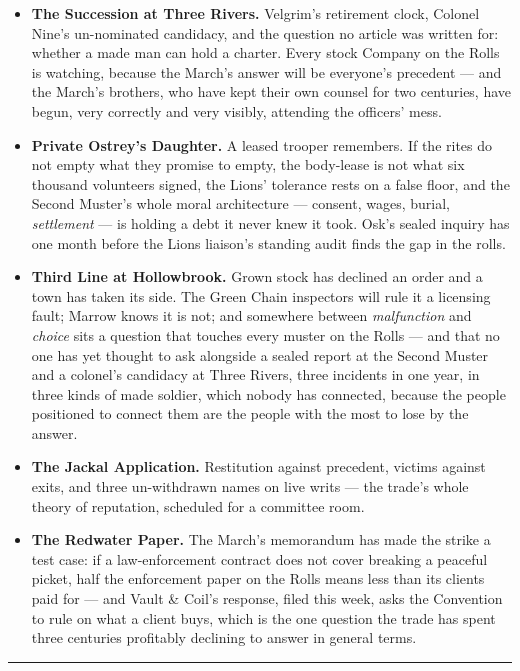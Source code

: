 \begin{itemize}
    \item \textbf{The Succession at Three Rivers.} Velgrim's retirement clock, Colonel Nine's un-nominated candidacy, and the question no article was written for: whether a made man can hold a charter. Every stock Company on the Rolls is watching, because the March's answer will be everyone's precedent --- and the March's brothers, who have kept their own counsel for two centuries, have begun, very correctly and very visibly, attending the officers' mess.
    \item \textbf{Private Ostrey's Daughter.} A leased trooper remembers. If the rites do not empty what they promise to empty, the body-lease is not what six thousand volunteers signed, the Lions' tolerance rests on a false floor, and the Second Muster's whole moral architecture --- consent, wages, burial, \textit{settlement} --- is holding a debt it never knew it took. Osk's sealed inquiry has one month before the Lions liaison's standing audit finds the gap in the rolls.
    \item \textbf{Third Line at Hollowbrook.} Grown stock has declined an order and a town has taken its side. The Green Chain inspectors will rule it a licensing fault; Marrow knows it is not; and somewhere between \textit{malfunction} and \textit{choice} sits a question that touches every muster on the Rolls --- and that no one has yet thought to ask alongside a sealed report at the Second Muster and a colonel's candidacy at Three Rivers, three incidents in one year, in three kinds of made soldier, which nobody has connected, because the people positioned to connect them are the people with the most to lose by the answer.
    \item \textbf{The Jackal Application.} Restitution against precedent, victims against exits, and three un-withdrawn names on live writs --- the trade's whole theory of reputation, scheduled for a committee room.
    \item \textbf{The Redwater Paper.} The March's memorandum has made the strike a test case: if a law-enforcement contract does not cover breaking a peaceful picket, half the enforcement paper on the Rolls means less than its clients paid for --- and Vault \& Coil's response, filed this week, asks the Convention to rule on what a client buys, which is the one question the trade has spent three centuries profitably declining to answer in general terms.
\end{itemize}

\medskip\hrule\medskip

